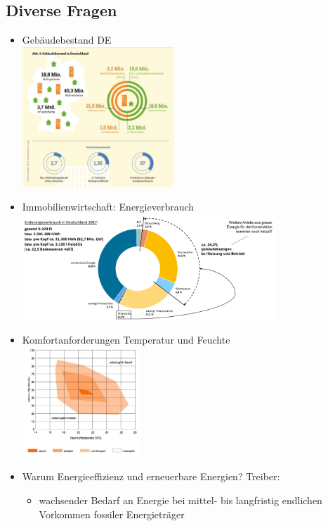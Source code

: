 \documentclass[fleqn,twoside,dvipsnames]{article}
\begin{document}
    \subsection{Diverse Fragen}
        \begin{itemize}
            \item Gebäudebestand DE\\
                \includegraphics[width=0.45\textwidth]{Grafiken/ES/Gebaudebestand DE.png}
            \item Immobilienwirtschaft: Energieverbrauch\\
                \includegraphics[width=0.75\textwidth]{Grafiken/ES/Energie Immobilien.png}
            \item Komfortanforderungen Temperatur und Feuchte\\
                \includegraphics[width=0.35\textwidth]{Grafiken/ES/Komfortanforderungen.png}
                \newpage
            \item Warum Energieeffizienz und erneuerbare Energien? Treiber:
                \begin{itemize}
                    \item wachsender Bedarf an Energie bei mittel- bis langfristig endlichen Vorkommen fossiler Energieträger

\end{itemize}
\end{itemize}
\end{document}
